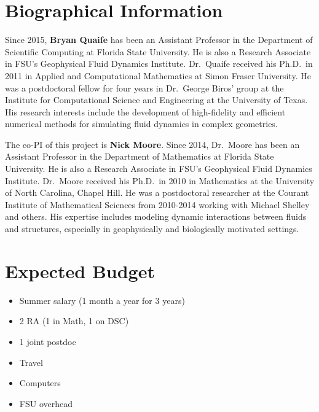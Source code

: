 \documentclass[11pt]{article}
\begin{document}

\section{Biographical Information}
Since 2015, {\bf Bryan Quaife} has been an Assistant Professor in the
Department of Scientific Computing at Florida State University.  He is
also a Research Associate in FSU's Geophysical Fluid Dynamics Institute.
Dr.~Quaife received his Ph.D.~in 2011 in Applied and Computational
Mathematics at Simon Fraser University.  He was a postdoctoral fellow
for four years in Dr.~George Biros' group at the Institute for
Computational Science and Engineering at the University of Texas.  His
research interests include the development of  high-fidelity and
efficient numerical methods for simulating fluid dynamics in complex
geometries.

The co-PI of this project is {\bf Nick Moore}.  Since 2014, Dr.~Moore
has been an Assistant Professor in the Department of Mathematics at
Florida State University.  He is also a Research Associate in FSU's
Geophysical Fluid Dynamics Institute. 
Dr.~Moore received his Ph.D.~in 2010 in Mathematics at the University of North Carolina, Chapel Hill. He was a postdoctoral researcher at the Courant Institute of Mathematical Sciences from 2010-2014 working with Michael Shelley and others. His expertise includes modeling dynamic interactions between fluids and structures, especially in geophysically and biologically motivated settings. 


\section{Expected Budget}
\begin{itemize}
  \item Summer salary (1 month a year for 3 years)
  \item 2 RA (1 in Math, 1 on DSC)
  \item 1 joint postdoc
  \item Travel
  \item Computers
  \item FSU overhead
\end{itemize}




\footnotesize{}
\end{document}

